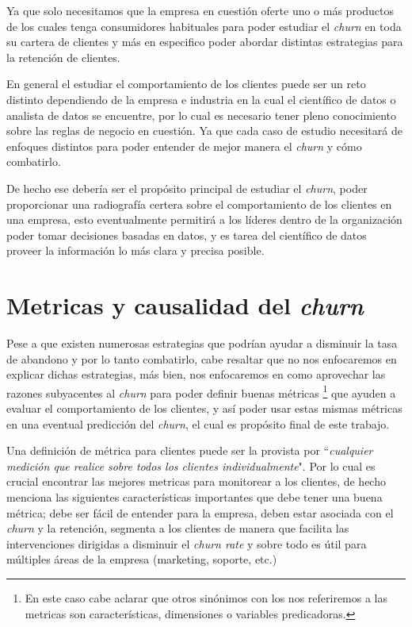 Ya que solo necesitamos que la empresa en cuestión oferte uno o más productos de los cuales tenga consumidores habituales para poder estudiar el \textit{churn} en toda su cartera de clientes y más en especifico poder abordar distintas estrategias para la retención de clientes. 

En general el estudiar el comportamiento de los clientes puede ser un reto distinto dependiendo de la empresa e industria en la cual el científico de datos o analista de datos se encuentre, por lo cual es necesario tener pleno conocimiento sobre las reglas de negocio en cuestión. Ya que cada caso de estudio necesitará de enfoques distintos para poder entender de mejor manera el \textit{churn} y cómo combatirlo.

De hecho ese debería ser el propósito principal de estudiar el \textit{churn}, poder proporcionar una radiografía certera sobre el comportamiento de los clientes en una empresa, esto eventualmente permitirá a los líderes dentro de la organización poder tomar decisiones basadas en datos, y es tarea del científico de datos proveer la información lo más clara y precisa posible.

\section{Metricas y causalidad del \textit{churn}}

Pese a que existen numerosas estrategias que podrían ayudar a disminuir la tasa de abandono y por lo tanto combatirlo, cabe resaltar que no nos enfocaremos en explicar dichas estrategias, más bien, nos enfocaremos en como aprovechar las razones subyacentes al \textit{churn} para poder definir buenas métricas \footnote{En este caso cabe aclarar que otros sinónimos con los nos referiremos a las metricas son características, dimensiones o variables predicadoras.} que ayuden a evaluar el comportamiento de los clientes, y así poder usar estas mismas métricas en una eventual predicción del \textit{churn}, el cual es propósito final de este trabajo.

Una definición de métrica para clientes puede ser la provista por \citet[p. 51]{2020Gold} ``\textit{cualquier medición que realice sobre todos los clientes individualmente}". Por lo cual es crucial encontrar las mejores metricas para monitorear a los clientes, de hecho \cite{2020Gold} menciona las siguientes características importantes que debe tener una buena métrica; debe ser fácil de entender para la empresa, deben estar asociada con el \textit{churn} y la retención, segmenta a los clientes de manera que facilita las intervenciones dirigidas a disminuir el \textit{churn rate} y sobre todo es útil para múltiples áreas de la empresa (marketing, soporte, etc.)

